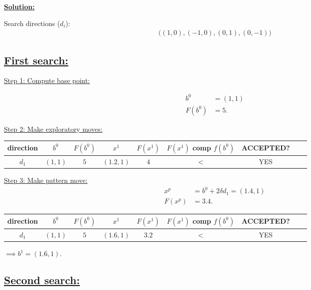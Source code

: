 \documentclass{article}
\begin{document}
\begin{center}
  \textbf{\underline{Solution:}}  
\end{center}

Search directions ($d_i$):
\begin{align*}
  \bigg( (1, 0), (-1, 0), (0, 1), (0, -1) \bigg)
\end{align*}

\subsection*{\underline{First search:}}

\underline{Step 1: Compute base point:}

\begin{align*}
  b^{0}    &= (1, 1) \\
  F(b^{0}) &= 5.
\end{align*}
\newline

\underline{Step 2: Make exploratory moves:}
\newline

\begin{tabular}{ |c|c|c|c|c|c|c|c|c| }
\hline
direction & $b^0$ & $F(b^0)$ & $x^1$ & $F(x^1)$ & $F(x^1)$ \: comp \: $f(b^0)$ & ACCEPTED? \\ 
\hline
$d_1$ & $(1, 1)$ & $5$ & $(1.2, 1)$ & $4$ & $<$ & YES \\ 
\hline
\end{tabular}
\newline

\underline{Step 3: Make pattern move:}
\begin{align*}
  x^p &= b^0 + 2 \delta d_1 = (1.4, 1) \\
  F(x^p) & = 3.4.
\end{align*}

\begin{tabular}{ |c|c|c|c|c|c|c|c|c| }
\hline
direction & $b^0$ & $F(b^0)$ & $x^1$ & $F(x^1)$ & $F(x^1)$ \: comp \: $f(b^0)$ & ACCEPTED? \\ 
\hline
$d_1$ & $(1, 1)$ & $5$ & $(1.6, 1)$ & $3.2$ & $<$ & YES \\ 
\hline
\end{tabular}
\newline

$\implies b^1 = (1.6, 1)$.
\newline

\subsection*{\underline{Second search:}}
\end{document}
